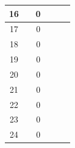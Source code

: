 \begin{table}[]
\begin{tabular}{|c|c|c|c|c|c|}
 		16                                           &                                  & 0                                &                                  &                                  &                                                     \\ \hline
 		17                                           &                                  & 0                                &                                  &                                  &                                                     \\ \hline
 		18                                           &                                  & 0                                &                                  &                                  &                                                     \\ \hline
 		19                                           &                                  & 0                                &                                  &                                  &                                                     \\ \hline
 		20                                           &                                  & 0                                &                                  &                                  &                                                     \\ \hline
 		21                                           &                                  & 0                                &                                  &                                  &                                                     \\ \hline
 		22                                           &                                  & 0                                &                                  &                                  &                                                     \\ \hline
 		23                                           &                                  & 0                                &                                  &                                  &                                                     \\ \hline
 		24                                           &                                  & 0                                &                                  &                                  &                                                     \\ \hline

\end{tabular}
\end{table}
